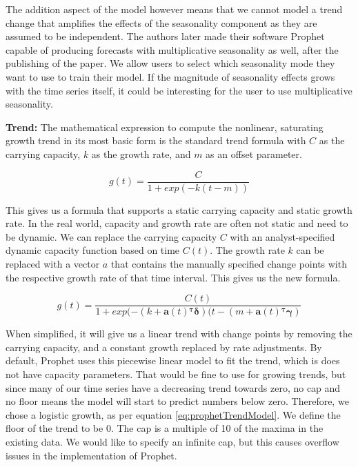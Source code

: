 The addition aspect of the model however means that we cannot model a trend change that amplifies the effects of the seasonality component as they are assumed to be independent. The authors later made their software Prophet capable of producing forecasts with multiplicative seasonality as well, after the publishing of the paper. We allow users to select which seasonality mode they want to use to train their model. If the magnitude of seasonality effects grows with the time series itself, it could be interesting for the user to use multiplicative seasonality. 

\textbf{Trend:} The mathematical expression to compute the nonlinear, saturating growth trend in its most basic form is the standard trend formula with \(C\) as the carrying capacity, \(k\) as the growth rate, and \(m\) as an offset parameter.

\begin{equation}
    g(t)=\dfrac{C}{1+exp(-k(t-m))}
    \label{eq:simpleTrendModel}
\end{equation}

This gives us a formula that supports a static carrying capacity and static growth rate. In the real world, capacity and growth rate are often not static and need to be dynamic. We can replace the carrying capacity \(C\) with an analyst-specified dynamic capacity function based on time \(C(t)\). The growth rate \(k\) can be replaced with a vector \(a\) that contains the manually specified change points with the respective growth rate of that time interval. This gives us the new formula.

\begin{equation}
    g(t)=\dfrac{C(t)}{1+exp(-(k+\boldsymbol{a}(t)\boldsymbol{^\tau}\boldsymbol{\delta})(t-(m+\boldsymbol{a}(t)\boldsymbol{^\tau}\boldsymbol{\gamma})}
    \label{eq:prophetTrendModel}
\end{equation}

When simplified, it will give us a linear trend with change points by removing the carrying capacity, and a constant growth replaced by rate adjustments.
By default, Prophet uses this piecewise linear model to fit the trend, which is does not have capacity parameters. That would be fine to use for growing trends, but since many of our time series have a decreasing trend towards zero, no cap and no floor means the model will start to predict numbers below zero. Therefore, we chose a logistic growth, as per equation \ref{eq:prophetTrendModel}. We define the floor of the trend to be 0. The cap is a multiple of 10 of the maxima in the existing data. We would like to specify an infinite cap, but this causes overflow issues in the implementation of Prophet.


